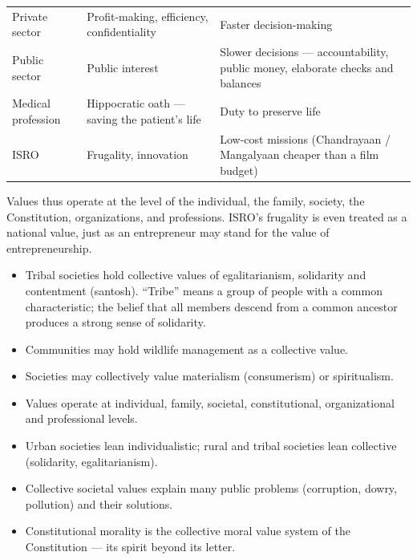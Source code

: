 \begin{center}
\begin{tabularx}{\textwidth}{>{\raggedright\arraybackslash}p{3.0cm} Y Y}
 &  &  \\
\toprule
Private sector & Profit-making, efficiency, confidentiality & Faster decision-making \\
Public sector & Public interest & Slower decisions --- accountability, public money, elaborate checks and balances \\
Medical profession & Hippocratic oath --- saving the patient's life & Duty to preserve life \\
ISRO & Frugality, innovation & Low-cost missions (Chandrayaan / Mangalyaan cheaper than a film budget) \\
\bottomrule
\end{tabularx}
\end{center}

Values thus operate at the level of the individual, the family, society, the Constitution, organizations, and professions. ISRO's frugality is even treated as a national value, just as an entrepreneur may stand for the value of entrepreneurship.

\begin{ExampleBox}
\begin{itemize}
\item Tribal societies hold collective values of egalitarianism, solidarity and contentment (santosh). ``Tribe'' means a group of people with a common characteristic; the belief that all members descend from a common ancestor produces a strong sense of solidarity.
\item Communities may hold wildlife management as a collective value.
\item Societies may collectively value materialism (consumerism) or spiritualism.
\end{itemize}
\end{ExampleBox}

\begin{QuickRevision}
\begin{itemize}
\item Values operate at individual, family, societal, constitutional, organizational and professional levels.
\item Urban societies lean individualistic; rural and tribal societies lean collective (solidarity, egalitarianism).
\item Collective societal values explain many public problems (corruption, dowry, pollution) and their solutions.
\item Constitutional morality is the collective moral value system of the Constitution --- its spirit beyond its letter.
\end{itemize}
\end{QuickRevision}

